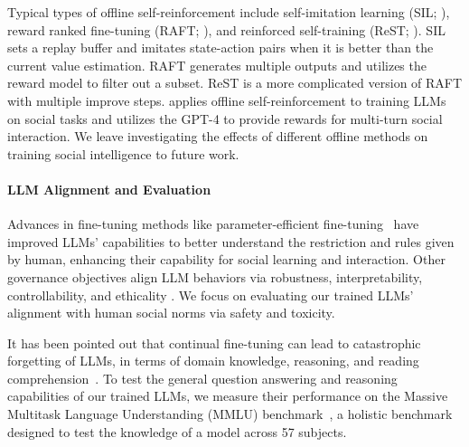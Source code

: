 Typical types of offline self-reinforcement include self-imitation learning (SIL; \citet{oh2018self}), reward ranked fine-tuning (RAFT; \citet{dong2023raft}), and reinforced self-training (ReST; \citet{ReST}). SIL sets a replay buffer and imitates state-action pairs when it is better than the current value estimation. RAFT generates multiple outputs and utilizes the reward model to filter out a subset. ReST is a more complicated version of RAFT with multiple improve steps. \model applies offline self-reinforcement to training LLMs on social tasks and utilizes the GPT-4 to provide rewards for multi-turn social interaction. We leave investigating the effects of different offline methods on training social intelligence to future work.

\paragraph{LLM Alignment and Evaluation}
Advances in fine-tuning methods like parameter-efficient fine-tuning~\citep{li2021prefixtuning, lester2021power,lora} have  
improved LLMs' capabilities to better understand the restriction and rules given by human, enhancing their capability for social learning and interaction. Other governance objectives align LLM behaviors via robustness, interpretability, controllability, and ethicality
\citep{ji2024ai}. We focus on evaluating our trained LLMs' alignment with human social norms via safety and toxicity. 

It has been pointed out that continual fine-tuning can lead to catastrophic forgetting of LLMs, in terms of domain knowledge, reasoning, and reading comprehension~\citep{catastrophic-forgetting}. To test the general question answering and reasoning capabilities of our trained LLMs, we measure their performance on the Massive Multitask Language Understanding (MMLU) benchmark~\cite{hendrycks2020measuring}, a holistic benchmark designed to test the knowledge of a model across 57 subjects. 
